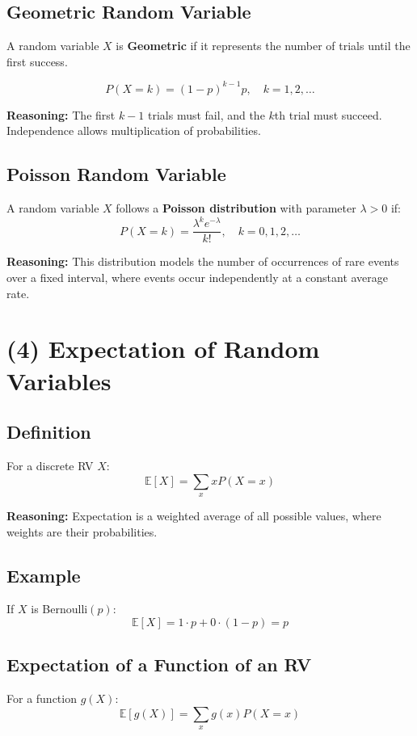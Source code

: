\documentclass[11pt]{article}
\begin{document}
\subsection*{Geometric Random Variable}

A random variable $X$ is \textbf{Geometric} if it represents the number of trials until the first success.

\[
P(X = k) = (1-p)^{k-1} p, \quad k = 1,2,\dots
\]

\textbf{Reasoning:}  
The first $k-1$ trials must fail, and the $k$th trial must succeed. Independence allows multiplication of probabilities.

\subsection*{Poisson Random Variable}

A random variable $X$ follows a \textbf{Poisson distribution} with parameter $\lambda > 0$ if:
\[
P(X = k) = \frac{\lambda^k e^{-\lambda}}{k!}, \quad k = 0,1,2,\dots
\]

\textbf{Reasoning:}  
This distribution models the number of occurrences of rare events over a fixed interval, where events occur independently at a constant average rate.

\section*{(4) Expectation of Random Variables}

\subsection*{Definition}
For a discrete RV $X$:
\[
\mathbb{E}[X] = \sum_x x P(X = x)
\]

\textbf{Reasoning:}  
Expectation is a weighted average of all possible values, where weights are their probabilities.

\subsection*{Example}
If $X$ is Bernoulli$(p)$:
\[
\mathbb{E}[X] = 1 \cdot p + 0 \cdot (1-p) = p
\]

\subsection*{Expectation of a Function of an RV}
For a function $g(X)$:
\[
\mathbb{E}[g(X)] = \sum_x g(x) P(X = x)
\]
\end{document}
